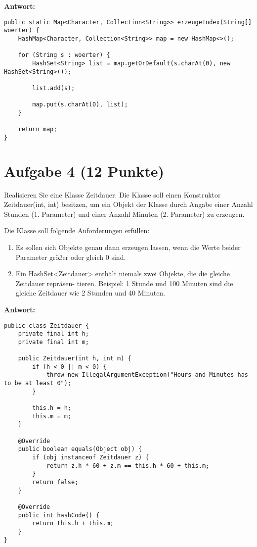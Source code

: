 \textbf{Antwort:}

\begin{lstlisting}
public static Map<Character, Collection<String>> erzeugeIndex(String[] woerter) {
    HashMap<Character, Collection<String>> map = new HashMap<>();

    for (String s : woerter) {
        HashSet<String> list = map.getOrDefault(s.charAt(0), new HashSet<String>());

        list.add(s);

        map.put(s.charAt(0), list);
    }

    return map;
}
\end{lstlisting}

\section{Aufgabe 4 (12 Punkte)}

Realisieren Sie eine Klasse Zeitdauer. Die Klasse soll einen Konstruktor
Zeitdauer(int, int) besitzen, um ein Objekt der Klasse durch Angabe einer
Anzahl Stunden (1. Parameter) und einer Anzahl Minuten (2. Parameter) zu
erzeugen.

Die Klasse soll folgende Anforderungen erfüllen:

\begin{enumerate}
    \item Es sollen sich Objekte genau dann erzeugen lassen, wenn die Werte beider
          Parameter größer oder gleich 0 sind.
    \item Ein HashSet<Zeitdauer> enthält niemals zwei Objekte, die die gleiche Zeitdauer
          repräsen- tieren. Beispiel: 1 Stunde und 100 Minuten sind die gleiche Zeitdauer
          wie 2 Stunden und 40 Minuten.
\end{enumerate}

\textbf{Antwort:}

\begin{lstlisting}
public class Zeitdauer {
    private final int h;
    private final int m;

    public Zeitdauer(int h, int m) {
        if (h < 0 || m < 0) {
            throw new IllegalArgumentException("Hours and Minutes has to be at least 0");
        }

        this.h = h;
        this.m = m;
    }

    @Override 
    public boolean equals(Object obj) {
        if (obj instanceof Zeitdauer z) {
            return z.h * 60 + z.m == this.h * 60 + this.m;
        }
        return false;
    }

    @Override 
    public int hashCode() {
        return this.h + this.m;
    }
}
\end{lstlisting}

